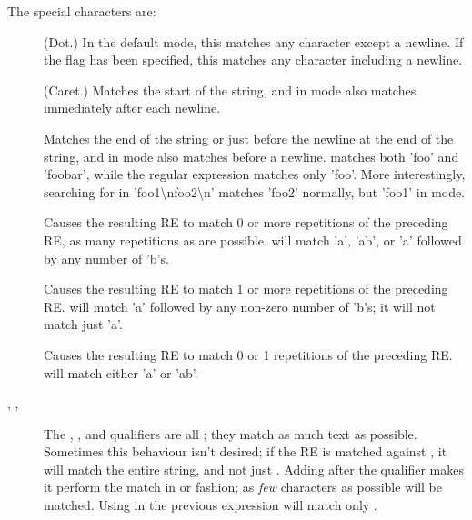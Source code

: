 The special characters are:
%
\begin{description}

\item[] (Dot.)  In the default mode, this matches any
character except a newline.  If the  flag has been
specified, this matches any character including a newline.

\item[\character{\textasciicircum}] (Caret.)  Matches the start of the
string, and in  mode also matches immediately
after each newline.

\item[\character{\$}] Matches the end of the string or just before the
newline at the end of the string, and in  mode
also matches before a newline.   matches both 'foo' and
'foobar', while the regular expression  matches only
'foo'.  More interestingly, searching for  in
'foo1\textbackslash nfoo2\textbackslash n' matches 'foo2' normally,
but 'foo1' in  mode.

\item[\character{*}] Causes the resulting RE to
match 0 or more repetitions of the preceding RE, as many repetitions
as are possible.   will
match 'a', 'ab', or 'a' followed by any number of 'b's.

\item[\character{+}] Causes the
resulting RE to match 1 or more repetitions of the preceding RE.
 will match 'a' followed by any non-zero number of 'b's; it
will not match just 'a'.

\item[] Causes the resulting RE to
match 0 or 1 repetitions of the preceding RE.   will
match either 'a' or 'ab'.

\item[, , ] The \character{*},
\character{+}, and  qualifiers are all ; they
match as much text as possible.  Sometimes this behaviour isn't
desired; if the RE  is matched against
, it will match the entire string, and not just
.  Adding  after the qualifier makes it
perform the match in  or  fashion; as
\emph{few} characters as possible will be matched.  Using 
in the previous expression will match only .


\end{description}
